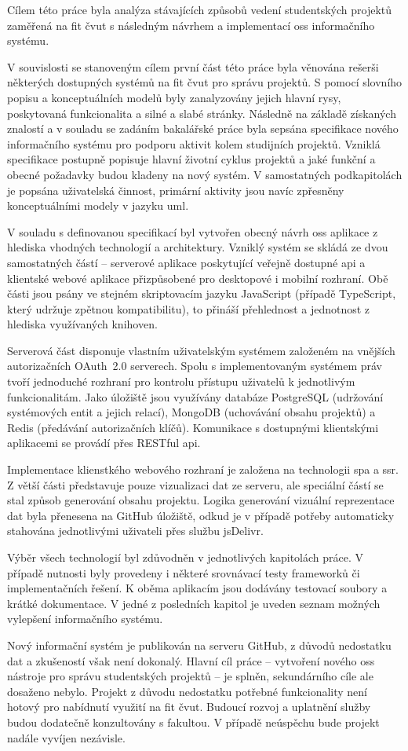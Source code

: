 Cílem této práce byla analýza stávajících způsobů vedení studentských projektů zaměřená na \gls{fit} \gls{čvut} s následným návrhem a implementací \gls{oss} informačního systému.

V souvislosti se stanoveným cílem první část této práce byla věnována rešerši některých dostupných systémů na \gls{fit} \gls{čvut} pro správu projektů. S pomocí slovního popisu a konceptuálních modelů byly zanalyzovány jejich hlavní rysy, poskytovaná funkcionalita a silné a slabé stránky. Následně na základě získaných znalostí a v souladu se zadáním bakalářské práce byla sepsána specifikace nového informačního systému pro podporu aktivit kolem studijních projektů. Vzniklá specifikace postupně popisuje hlavní životní cyklus projektů a jaké funkční a obecné požadavky budou kladeny na nový systém. V samostatných podkapitolách je popsána uživatelská činnost, primární aktivity jsou navíc zpřesněny konceptuálními modely v jazyku \gls{uml}.

V souladu s definovanou specifikací byl vytvořen obecný návrh \gls{oss} aplikace z hlediska vhodných technologií a architektury. Vzniklý systém se skládá ze dvou samostatných částí -- serverové aplikace poskytující veřejně dostupné \gls{api} a klientské webové aplikace přizpůsobené pro desktopové i mobilní rozhraní. Obě části jsou psány ve stejném skriptovacím jazyku JavaScript (případě TypeScript, který udržuje zpětnou kompatibilitu), to přináší přehlednost a jednotnost z hlediska využívaných knihoven. 

Serverová část disponuje vlastním uživatelským systémem založeném na vnějších autorizačních OAuth~2.0 serverech. Spolu s implementovaným systémem práv tvoří jednoduché rozhraní pro kontrolu přístupu uživatelů k jednotlivým funkcionalitám. Jako úložiště jsou využívány databáze PostgreSQL (udržování systémových entit a jejich relací), MongoDB (uchovávání obsahu projektů) a Redis (předávání autorizačních klíčů). Komunikace s dostupnými klientskými aplikacemi se provádí přes RESTful \gls{api}.

Implementace klienstkého webového rozhraní je založena na technologii \gls{spa} a \gls{ssr}. Z větší části představuje pouze vizualizaci dat ze serveru, ale speciální částí se stal způsob generování obsahu projektu. Logika generování vizuální reprezentace dat byla přenesena na GitHub úložiště, odkud je v případě potřeby automaticky stahována jednotlivými uživateli přes službu jsDelivr. 

Výběr všech technologií byl zdůvodněn v jednotlivých kapitolách práce. V případě nutnosti byly provedeny i některé srovnávací testy frameworků či implementačních řešení. K oběma aplikacím jsou dodávány testovací soubory a krátké dokumentace. V jedné z posledních kapitol je uveden seznam možných vylepšení informačního systému.

Nový informační systém je publikován na serveru GitHub, z důvodů nedostatku dat a zkušeností však není dokonalý. Hlavní cíl práce -- vytvoření nového \gls{oss} nástroje pro správu studentských projektů -- je splněn, sekundárního cíle ale dosaženo nebylo. Projekt z důvodu nedostatku potřebné funkcionality není hotový pro nabídnutí využití na \gls{fit} \gls{čvut}. Budoucí rozvoj a uplatnění služby budou dodatečně konzultovány s fakultou. V případě neúspěchu bude projekt nadále vyvíjen nezávisle.